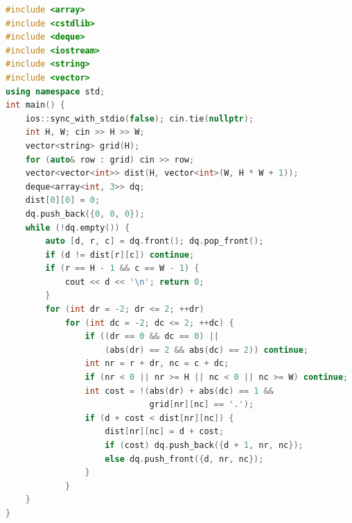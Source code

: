 \documentclass[11pt]{article}
\begin{document}
\begin{lstlisting}[language=C++,caption={P15 --- C++17},label={lst:p15-cpp}]
#include <array>
#include <cstdlib>
#include <deque>
#include <iostream>
#include <string>
#include <vector>
using namespace std;
int main() {
    ios::sync_with_stdio(false); cin.tie(nullptr);
    int H, W; cin >> H >> W;
    vector<string> grid(H);
    for (auto& row : grid) cin >> row;
    vector<vector<int>> dist(H, vector<int>(W, H * W + 1));
    deque<array<int, 3>> dq;
    dist[0][0] = 0;
    dq.push_back({0, 0, 0});
    while (!dq.empty()) {
        auto [d, r, c] = dq.front(); dq.pop_front();
        if (d != dist[r][c]) continue;
        if (r == H - 1 && c == W - 1) {
            cout << d << '\n'; return 0;
        }
        for (int dr = -2; dr <= 2; ++dr)
            for (int dc = -2; dc <= 2; ++dc) {
                if ((dr == 0 && dc == 0) ||
                    (abs(dr) == 2 && abs(dc) == 2)) continue;
                int nr = r + dr, nc = c + dc;
                if (nr < 0 || nr >= H || nc < 0 || nc >= W) continue;
                int cost = !(abs(dr) + abs(dc) == 1 &&
                             grid[nr][nc] == '.');
                if (d + cost < dist[nr][nc]) {
                    dist[nr][nc] = d + cost;
                    if (cost) dq.push_back({d + 1, nr, nc});
                    else dq.push_front({d, nr, nc});
                }
            }
    }
}
\end{lstlisting}
\end{document}
